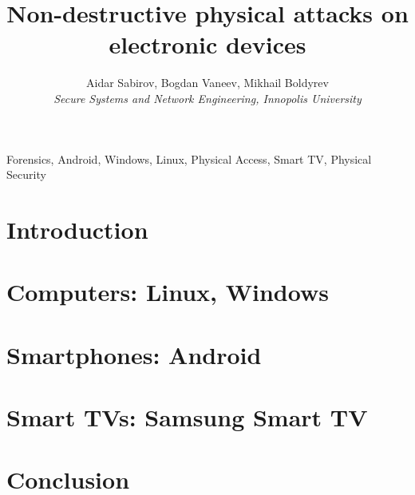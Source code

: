 \documentclass[journal]{IEEEtran}
\begin{document}
\title{Non-destructive physical attacks on electronic devices}
\author{Aidar Sabirov, Bogdan Vaneev, Mikhail Boldyrev \\ \textit{Secure Systems and Network Engineering, Innopolis University}}
%
{}
\maketitle

\begin{abstract}

\end{abstract}

\begin{IEEEkeywords}
Forensics, Android, Windows, Linux, Physical Access, Smart TV, Physical Security
\end{IEEEkeywords}

\IEEEpeerreviewmaketitle



\section{Introduction}


\section{Computers: Linux, Windows}


\section{Smartphones: Android}


\section{Smart TVs: Samsung Smart TV}


\section{Conclusion}





\ifCLASSOPTIONcaptionsoff
  \newpage
\fi


\appendices


\end{document}

